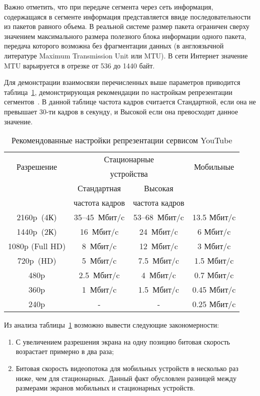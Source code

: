 Важно отметить, что при передаче сегмента через сеть информация, содержащаяся в сегменте информация представляется ввиде последовательности из пакетов равного объема. В реальной системе размер пакета ограничен сверху значением максимального размера полезного блока информации одного пакета, передача которого возможна без фрагментации данных (в англоязычной литературе Maximum Transmission Unit или MTU). В сети Интернет значение MTU варьируется в отрезке от 536 до 1440 байт.

Для демонстрации взаимосвязи перечисленных выше параметров приводится таблица~\ref{tab:youtubeBr}, демонстрирующая рекомендации по настройкам репрезентации сегментов~\cite{YouTubeBR,HuaweiReport}. В данной таблице частота кадров считается Стандартной, если она не превышает 30-ти кадров в секунду, и Высокой если она превосходит данное значение.

\begin{table}[!h]
    \caption{Рекомендованные настройки репрезентации сервисом YouTube}
    \begin{center}
		\label{tab:youtubeBr}
	    \begin{tabular}{|c|c|c|c|}
		\hline
		\multirow{2}{*}{Разрешение} & \multicolumn{2}{c|}{Стационарные} & \multirow{2}{*}{Мобильные} \\
		 & \multicolumn{2}{c|}{устройства} & \multirow{2}{*}{устройства} \\
		\cline{2-3}
		 & Стандартная & Высокая & \\
		 & частота кадров & частота кадров & \\
		\hline
		2160p (4К) & 35–45 Мбит/c & 53–68 Мбит/c & 13.5 Мбит/c \\
		\hline
		1440p (2К) & 16 Мбит/c & 24 Мбит/c & 6 Мбит/c \\
		\hline
		1080p (Full HD) & 8 Мбит/c & 12 Мбит/c & 3 Мбит/c \\
		\hline
		720p (HD) & 5 Мбит/c & 7.5 Мбит/c & 1.5 Мбит/c \\
		\hline
		480p & 2.5 Мбит/c & 4 Мбит/c & 0.7 Мбит/c \\
		\hline
		360p & 1 Мбит/c & 1.5 Мбит/c & 0.45 Мбит/c \\
		\hline
		240p & - & - & 0.25 Мбит/c \\
		\hline
		\end{tabular}
	\end{center}
\end{table}

Из анализа таблицы~\ref{tab:youtubeBr} возможно вывести следующие закономерности:
\begin{enumerate}
  \item С увеличением разрешения экрана на одну позицию битовая скорость возрастает примерно в два раза;
  \item Битовая скорость видеопотока для мобильных устройств в несколько раз ниже, чем для стационарных. Данный факт обусловлен разницей между размерами экранов мобильных и стационарных устройств.
\end{enumerate}

